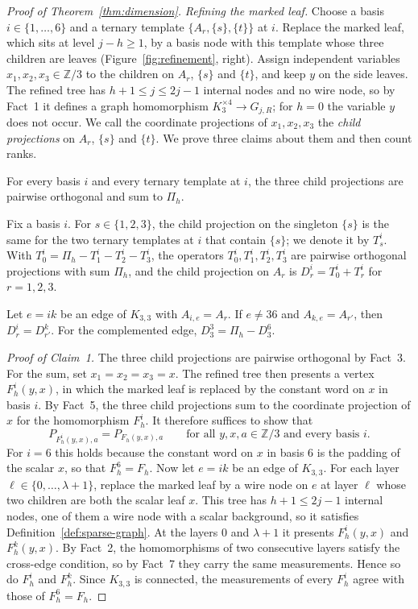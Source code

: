 \begin{proof}[Proof of Theorem~\ref{thm:dimension}]
\emph{Refining the marked leaf.} Choose a basis $i\in\{1,\ldots,6\}$ and a ternary template $\{A_r,\{s\},\{t\}\}$ at $i$. Replace the marked leaf, which sits at level $j-h\ge1$, by a basis node with this template whose three children are leaves (Figure~\ref{fig:refinement}, right). Assign independent variables $x_1,x_2,x_3\in\mathbb Z/3$ to the children on $A_r$, $\{s\}$ and $\{t\}$, and keep $y$ on the side leaves. The refined tree has $h+1\le j\le2j-1$ internal nodes and no wire node, so by Fact~1 it defines a graph homomorphism $K_3^{\times4}\to G_{j,R}$; for $h=0$ the variable $y$ does not occur. We call the coordinate projections of $x_1,x_2,x_3$ the \emph{child projections} on $A_r$, $\{s\}$ and $\{t\}$. We prove three claims about them and then count ranks.
\begin{list}{}{\setlength{\labelwidth}{3.6em}\setlength{\labelsep}{0.6em}\setlength{\leftmargin}{4.2em}\setlength{\itemsep}{3pt}\setlength{\parsep}{0pt}\setlength{\topsep}{4pt}}
\item[\textup{Claim 1.}] For every basis $i$ and every ternary template at $i$, the three child projections are pairwise orthogonal and sum to $\Pi_h$.
\item[\textup{Claim 2.}] Fix a basis $i$. For $s\in\{1,2,3\}$, the child projection on the singleton $\{s\}$ is the same for the two ternary templates at $i$ that contain $\{s\}$; we denote it by $T^i_s$. With $T^i_0=\Pi_h-T^i_1-T^i_2-T^i_3$, the operators $T^i_0,T^i_1,T^i_2,T^i_3$ are pairwise orthogonal projections with sum $\Pi_h$, and the child projection on $A_r$ is $D^i_r=T^i_0+T^i_r$ for $r=1,2,3$.
\item[\textup{Claim 3.}] Let $e=ik$ be an edge of $K_{3,3}$ with $A_{i,e}=A_r$. If $e\ne36$ and $A_{k,e}=A_{r'}$, then $D^i_r=D^k_{r'}$. For the complemented edge, $D^3_3=\Pi_h-D^6_3$.
\end{list}

\emph{Proof of Claim~1.} The three child projections are pairwise orthogonal by Fact~3. For the sum, set $x_1=x_2=x_3=x$. The refined tree then presents a vertex $F^i_h(y,x)$, in which the marked leaf is replaced by the constant word on $x$ in basis $i$. By Fact~5, the three child projections sum to the coordinate projection of $x$ for the homomorphism $F^i_h$. It therefore suffices to show that
\[
 P_{F^i_h(y,x),a}=P_{F_h(y,x),a}\qquad\text{for all }y,x,a\in\mathbb Z/3\text{ and every basis }i.
\]
For $i=6$ this holds because the constant word on $x$ in basis $6$ is the padding of the scalar $x$, so that $F^6_h=F_h$. Now let $e=ik$ be an edge of $K_{3,3}$. For each layer $\ell\in\{0,\ldots,\lambda+1\}$, replace the marked leaf by a wire node on $e$ at layer $\ell$ whose two children are both the scalar leaf $x$. This tree has $h+1\le2j-1$ internal nodes, one of them a wire node with a scalar background, so it satisfies Definition~\ref{def:sparse-graph}. At the layers $0$ and $\lambda+1$ it presents $F^i_h(y,x)$ and $F^k_h(y,x)$. By Fact~2, the homomorphisms of two consecutive layers satisfy the cross-edge condition, so by Fact~7 they carry the same measurements. Hence so do $F^i_h$ and $F^k_h$. Since $K_{3,3}$ is connected, the measurements of every $F^i_h$ agree with those of $F^6_h=F_h$.


\end{proof}
